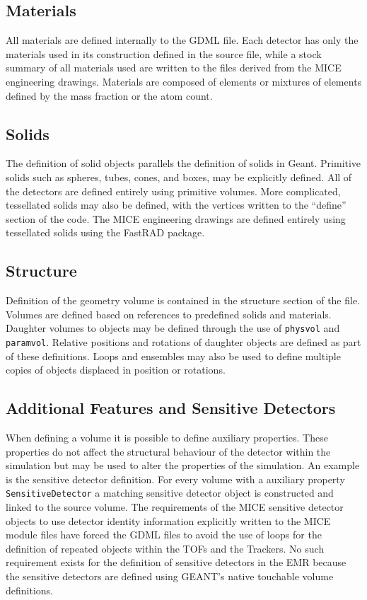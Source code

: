 \subsection{Materials}
All materials are defined internally to the GDML file. Each detector
has only the materials used in its construction defined in the source
file, while a stock summary of all materials used are written to the
files derived from the MICE engineering drawings. Materials are
composed of elements or mixtures of elements defined by the mass
fraction or the atom count.

\subsection{Solids}
The definition of solid objects parallels the definition of solids in
Geant. Primitive solids such as spheres, tubes, cones, and boxes, may
be explicitly defined. All of the detectors are defined entirely using
primitive volumes. More complicated, tessellated solids may also be
defined, with the vertices written to the ``define'' section of the
code. The MICE engineering drawings are defined entirely using
tessellated solids using the FastRAD package.

\subsection{Structure}
Definition of the geometry volume is contained in the structure
section of the file. Volumes are defined based on references to
predefined solids and materials. Daughter volumes to objects may be
defined through the use of \verb+physvol+ and
\verb+paramvol+. Relative positions and rotations of daughter objects
are defined as part of these definitions. Loops and ensembles may also
be used to define multiple copies of objects displaced in position or
rotations.

\subsection{Additional Features and Sensitive Detectors}
When defining a volume it is possible to define auxiliary
properties. These properties do not affect the structural behaviour of
the detector within the simulation but may be used to alter the
properties of the simulation. An example is the sensitive detector
definition. For every volume with a auxiliary property
\verb+SensitiveDetector+ a matching sensitive detector object is
constructed and linked to the source volume. The requirements of the
MICE sensitive detector objects to use detector identity information
explicitly written to the MICE module files have forced the GDML files
to avoid the use of loops for the definition of repeated objects
within the TOFs and the Trackers. No such requirement exists for the
definition of sensitive detectors in the EMR because the sensitive
detectors are defined using GEANT's native touchable volume
definitions.

